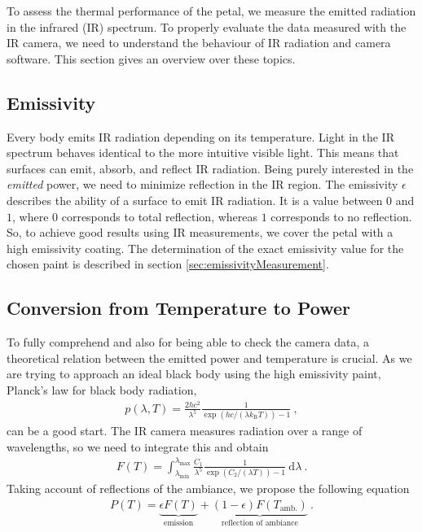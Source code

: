 To assess the thermal performance of the petal, we measure the emitted radiation in the infrared (IR) spectrum. To properly evaluate the data measured with the IR camera, we need to understand the behaviour of IR radiation and camera software. This section gives an overview over these topics.
\subsection{Emissivity\label{sec:emissivity}}
Every body emits IR radiation depending on its temperature. Light in the IR spectrum behaves identical to the more intuitive visible light. This means that surfaces can emit, absorb, and reflect IR radiation. Being purely interested in the \textit{emitted} power, we need to minimize reflection in the IR region. The emissivity $\epsilon$ describes the ability of a surface to emit IR radiation. It is a value between $0$ and $1$, where $0$ corresponds to total reflection, whereas $1$ corresponds to no reflection. So, to achieve good results using IR measurements, we cover the petal with a high emissivity coating. The determination of the exact emissivity value for the chosen paint is described in section \ref{sec:emissivityMeasurement}.


\subsection{Conversion from Temperature to Power\label{sec:theory}}
To fully comprehend and also for being able to check the camera data, a theoretical relation between the emitted power and temperature is crucial. As we are trying to approach an ideal black body using the high emissivity paint, Planck's law for black body radiation,
\begin{align}
	p(\lambda, T) = \frac{2hc^2}{\lambda^5}\frac{1}{\exp\left(hc/(\lambda k_\text{B}T)\right)-1} \ ,
\end{align}
can be a good start. The IR camera measures radiation over a range of wavelengths, so we need to integrate this and obtain
\begin{align}
	F(T) = \int_{\lambda_\text{min}}^{\lambda_\text{max}}\frac{C_1}{\lambda^5}\frac{1}{\exp\left(C_2/(\lambda T)\right)-1}\ \text{d}\lambda \ .
\end{align}
Taking account of reflections of the ambiance, we propose the following equation
\begin{align}\label{eq:powerTemp}
	P(T) = \underbrace{\epsilon F(T)}_\text{emission} + \underbrace{(1-\epsilon)F(T_\text{amb.})}_\text{reflection of ambiance} \ .
\end{align}

